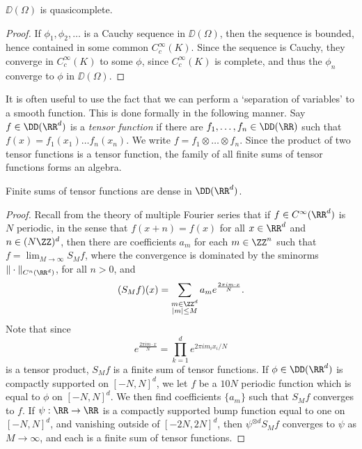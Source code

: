 \begin{corollary}
    $\DD(\Omega)$ is quasicomplete.
\end{corollary}
\begin{proof}
    If $\phi_1, \phi_2, \dots$ is a Cauchy sequence in $\DD(\Omega)$, then the sequence is bounded, hence contained in some common $C_c^\infty(K)$. Since the sequence is Cauchy, they converge in $C_c^\infty(K)$ to some $\phi$, since $C_c^\infty(K)$ is complete, and thus the $\phi_n$ converge to $\phi$ in $\DD(\Omega)$.
\end{proof}

It is often useful to use the fact that we can perform a `separation of variables' to a smooth function. This is done formally in the following manner. Say $f \in \DD(\RR^d)$ is a {\it tensor function} if there are $f_1, \dots, f_n \in \DD(\RR)$ such that $f(x) = f_1(x_1) \dots f_n(x_n)$. We write $f = f_1 \otimes \dots \otimes f_n$. Since the product of two tensor functions is a tensor function, the family of all finite sums of tensor functions forms an algebra.

\begin{theorem}
    Finite sums of tensor functions are dense in $\DD(\RR^d)$.
\end{theorem}
\begin{proof}
    Recall from the theory of multiple Fourier series that if $f \in C^\infty(\RR^d)$ is $N$ periodic, in the sense that $f(x + n) = f(x)$ for all $x \in \RR^d$ and $n \in (N \ZZ)^d$, then there are coefficients $a_m$ for each $m \in \ZZ^n$ such that $f = \lim_{M \to \infty} S_M f$, where the convergence is dominated by the sminorms $\| \cdot \|_{C^n(\RR^d)}$, for all $n > 0$, and
    \[ (S_M f)(x) = \sum_{\substack{m \in \ZZ^d\\|m| \leq M}} a_m e^{\frac{2 \pi i m \cdot x}{N}}. \]
    Note that since
    \[ e^{\frac{2 \pi i m \cdot x}{N}} = \prod_{k = 1}^d e^{2 \pi i m_ix_i/N} \]
    is a tensor product, $S_M f$ is a finite sum of tensor functions. If $\phi \in \DD(\RR^d)$ is compactly supported on $[-N,N]^d$, we let $f$ be a $10N$ periodic function which is equal to $\phi$ on $[-N,N]^d$. We then find coefficients $\{ a_m \}$ such that $S_M f$ converges to $f$. If $\psi: \RR \to \RR$ is a compactly supported bump function equal to one on $[-N,N]^d$, and vanishing outside of $[-2N,2N]^d$, then $\psi^{\otimes d} S_M f$ converges to $\psi$ as $M \to \infty$, and each is a finite sum of tensor functions.
\end{proof}

